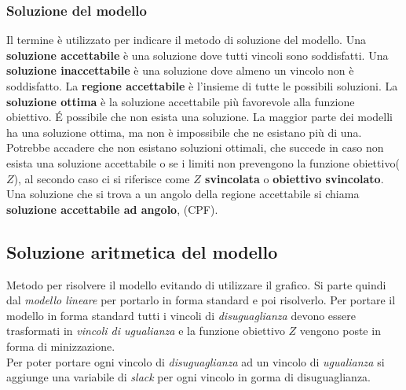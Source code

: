 \documentclass{article}
\begin{document}
    \subsubsection{Soluzione del modello}
      Il termine è utilizzato per indicare il metodo di soluzione del modello. Una \textbf{soluzione accettabile} è una soluzione dove tutti vincoli sono soddisfatti. Una \textbf{soluzione inaccettabile} è una soluzione dove almeno un vincolo non è soddisfatto. La \textbf{regione accettabile} è l'insieme di tutte le possibili soluzioni. La \textbf{soluzione ottima} è la soluzione accettabile più favorevole alla funzione obiettivo. É possibile che non esista una soluzione. La maggior parte dei modelli ha una soluzione ottima, ma non è impossibile che ne esistano più di una. Potrebbe accadere che non esistano soluzioni ottimali, che succede in caso non esista una soluzione accettabile o se i limiti non prevengono la funzione obiettivo($Z$), al secondo caso ci si riferisce come \textbf{$Z$ svincolata} o \textbf{obiettivo svincolato}. Una soluzione che si trova a un angolo della regione accettabile si chiama \textbf{soluzione accettabile ad angolo}, (CPF).


    \subsection{Soluzione aritmetica del modello}
        Metodo per risolvere il modello evitando di utilizzare il grafico. Si parte quindi dal \textit{modello lineare} per portarlo in forma standard e poi risolverlo. Per portare il modello in forma standard tutti i vincoli di \textit{disuguaglianza} devono essere trasformati in \textit{vincoli di ugualianza} e la funzione obiettivo $Z$ vengono poste in forma di minizzazione. \\ Per poter portare ogni vincolo di \textit{disuguaglianza} ad un vincolo di \textit{ugualianza} si aggiunge una variabile di \textit{slack} per ogni vincolo in gorma di disuguaglianza.
\end{document}
